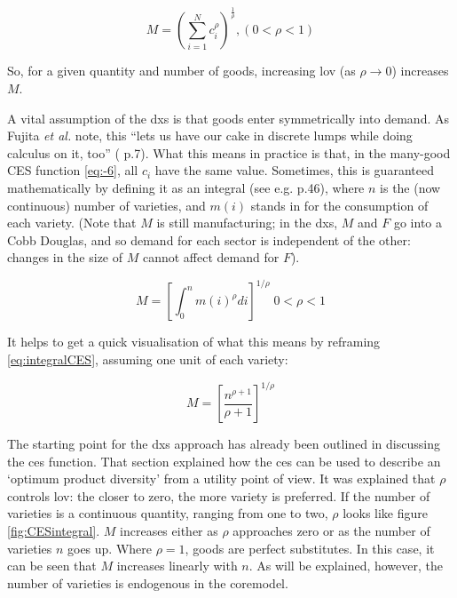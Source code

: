 \begin{equation}
M=\left(\sum_{i=1}^{N}c_{i}^{\rho}\right)^\frac{1}{\rho},(0<\rho<1)
\end{equation}

So, for a given quantity and number of goods, increasing \gls{lov} (as $\rho\rightarrow 0$) increases $M$. 

A vital assumption of the \gls{dxs} is that goods enter symmetrically into demand. As Fujita \emph{et al.} note, this ``lets us have our cake in discrete lumps while doing calculus on it, too'' (\citealt{fujita_spatial_2001} p.7). What this means in practice is that, in the many-good CES function \eqref{eq:-6}, all $c_{i}$ have the same value. Sometimes, this is guaranteed mathematically by defining it as an integral (see e.g. \citealt{fujita_spatial_2001} p.46), where $n$ is the (now continuous) number of varieties, and $m(i)$ stands in for the consumption of each variety. (Note that $M$ is still manufacturing; in the \gls{dxs}, $M$ and $F$ go into a Cobb Douglas, and so demand for each sector is independent of the other: changes in the size of $M$ cannot affect demand for $F$).

\begin{equation}
M=\left[\int_{0}^{n}m(i)^{\rho}di\right]^{1/\rho}\; 0<\rho<1\label{eq:integralCES}
\end{equation}

It helps to get a quick visualisation of what this means by reframing \eqref{eq:integralCES}, assuming one unit of each variety:

\begin{equation}
M=\left[\frac{n^{\rho+1}}{\rho+1}\right]^{1/\rho}\label{eq:integralCESsimplified}
\end{equation}

The starting point for the \gls{dxs} approach has already been outlined in discussing the \gls{ces} function. That section explained how the \gls{ces} can be used to describe an `optimum product diversity' from a utility point of view. It was explained that $\rho$ controls \gls{lov}: the closer to zero, the more variety is preferred. If the number of varieties is a continuous quantity, ranging from one to two, $\rho$ looks like figure \ref{fig:CESintegral}. $M$ increases either as $\rho$ approaches zero or as the number of varieties $n$ goes up. Where $\rho=1$, goods are perfect substitutes. In this case, it can be seen that $M$ increases linearly with $n$. As will be explained, however, the number of varieties is endogenous in the \gls{coremodel}.

